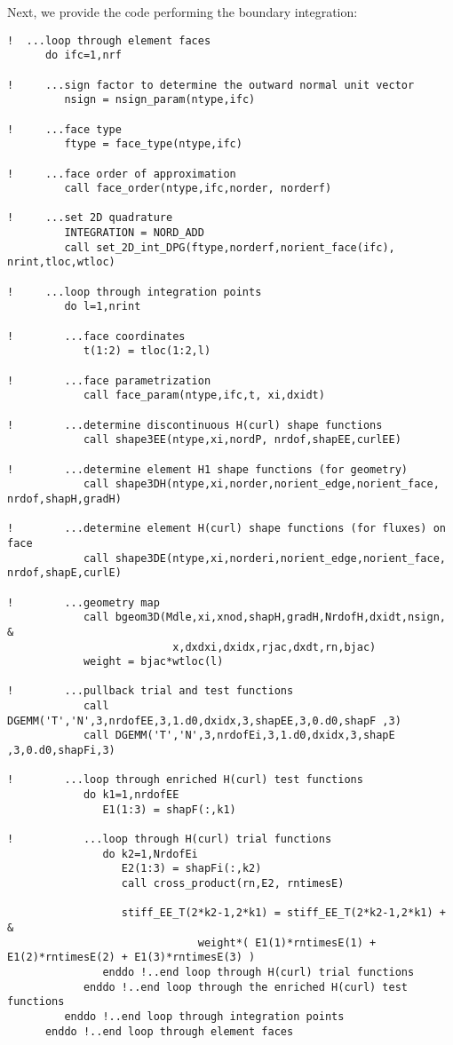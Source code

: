 Next, we provide the code performing the boundary integration:
\begin{lstlisting}[mathescape,caption=\file{MAXWELL/ULTRAWEAK\_DPG/}\routine{elem\_maxwell}: boundary integration]
!  ...loop through element faces
      do ifc=1,nrf

!     ...sign factor to determine the outward normal unit vector
         nsign = nsign_param(ntype,ifc)

!     ...face type
         ftype = face_type(ntype,ifc)

!     ...face order of approximation
         call face_order(ntype,ifc,norder, norderf)

!     ...set 2D quadrature
         INTEGRATION = NORD_ADD
         call set_2D_int_DPG(ftype,norderf,norient_face(ifc), nrint,tloc,wtloc)

!     ...loop through integration points
         do l=1,nrint

!        ...face coordinates
            t(1:2) = tloc(1:2,l)

!        ...face parametrization
            call face_param(ntype,ifc,t, xi,dxidt)

!        ...determine discontinuous H(curl) shape functions
            call shape3EE(ntype,xi,nordP, nrdof,shapEE,curlEE)

!        ...determine element H1 shape functions (for geometry)
            call shape3DH(ntype,xi,norder,norient_edge,norient_face, nrdof,shapH,gradH)

!        ...determine element H(curl) shape functions (for fluxes) on face
            call shape3DE(ntype,xi,norderi,norient_edge,norient_face, nrdof,shapE,curlE)

!        ...geometry map
            call bgeom3D(Mdle,xi,xnod,shapH,gradH,NrdofH,dxidt,nsign, &
                          x,dxdxi,dxidx,rjac,dxdt,rn,bjac)
            weight = bjac*wtloc(l)

!        ...pullback trial and test functions
            call DGEMM('T','N',3,nrdofEE,3,1.d0,dxidx,3,shapEE,3,0.d0,shapF ,3)
            call DGEMM('T','N',3,nrdofEi,3,1.d0,dxidx,3,shapE ,3,0.d0,shapFi,3)

!        ...loop through enriched H(curl) test functions
            do k1=1,nrdofEE
               E1(1:3) = shapF(:,k1)

!           ...loop through H(curl) trial functions
               do k2=1,NrdofEi
                  E2(1:3) = shapFi(:,k2)
                  call cross_product(rn,E2, rntimesE)

                  stiff_EE_T(2*k2-1,2*k1) = stiff_EE_T(2*k2-1,2*k1) + &
                              weight*( E1(1)*rntimesE(1) + E1(2)*rntimesE(2) + E1(3)*rntimesE(3) )
               enddo !..end loop through H(curl) trial functions
            enddo !..end loop through the enriched H(curl) test functions
         enddo !..end loop through integration points
      enddo !..end loop through element faces
\end{lstlisting}

